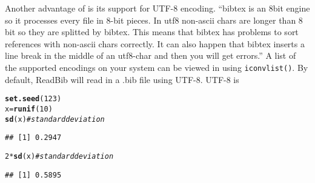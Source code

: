 \documentclass[article]{jss}\usepackage[]{graphicx}\usepackage[]{color}
\makeatletter
\newcommand{\hlnum}[1]{\textcolor[rgb]{0.686,0.059,0.569}{#1}}%
\newcommand{\hlcom}[1]{\textcolor[rgb]{0.678,0.584,0.686}{\textit{#1}}}%
\newcommand{\hlopt}[1]{\textcolor[rgb]{0,0,0}{#1}}%
\newcommand{\hlstd}[1]{\textcolor[rgb]{0.345,0.345,0.345}{#1}}%
\newcommand{\hlkwb}[1]{\textcolor[rgb]{0.69,0.353,0.396}{#1}}%
\newcommand{\hlkwd}[1]{\textcolor[rgb]{0.737,0.353,0.396}{\textbf{#1}}}%
\newenvironment{kframe}{%
 \def\at@end@of@kframe{}%
 \ifinner\ifhmode%
  \def\at@end@of@kframe{\end{minipage}}%
  \begin{minipage}{\columnwidth}%
 \fi\fi%
 \def\FrameCommand##1{\hskip\@totalleftmargin \hskip-\fboxsep
 \colorbox{shadecolor}{##1}\hskip-\fboxsep
     \hskip-\linewidth \hskip-\@totalleftmargin \hskip\columnwidth}%
 \MakeFramed {\advance\hsize-\width
   \@totalleftmargin\z@ \linewidth\hsize
   \@setminipage}}%
 {\par\unskip\endMakeFramed%
 \at@end@of@kframe}
\newenvironment{knitrout}{}{} %
\makeatother
\begin{document}
Another advantage of \Biblatex{} is its support for UTF-8 encoding. ``bibtex is an 8bit engine so it processes every file in 8-bit pieces. In utf8 non-ascii chars are longer than 8 bit so they are splitted by bibtex. This means that bibtex has problems to sort references with non-ascii chars correctly. It can also happen that bibtex inserts a line break in the middle of an utf8-char and then you will get errors.''  A list of the supported encodings on your system can be viewed in \R using \texttt{iconvlist()}.  By default, ReadBib will read in a .bib file using UTF-8.  UTF-8 is  

\begin{knitrout}
\color{fgcolor}\begin{kframe}
\begin{alltt}
\hlkwd{set.seed}\hlstd{(}\hlnum{123}\hlstd{)}
\hlstd{x} \hlkwb{=} \hlkwd{runif}\hlstd{(}\hlnum{10}\hlstd{)}
\hlkwd{sd}\hlstd{(x)}  \hlcom{# standard deviation}
\end{alltt}
\begin{verbatim}
## [1] 0.2947
\end{verbatim}
\end{kframe}
\end{knitrout}


\begin{knitrout}
\color{fgcolor}\begin{kframe}
\begin{alltt}
\hlnum{2} \hlopt{*} \hlkwd{sd}\hlstd{(x)}  \hlcom{# standard deviation}
\end{alltt}
\begin{verbatim}
## [1] 0.5895
\end{verbatim}
\end{kframe}
\end{knitrout}
\end{document}
